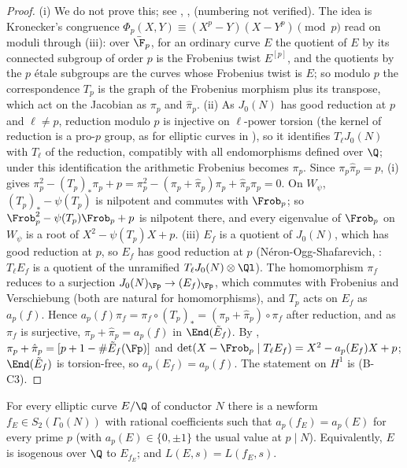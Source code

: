 \begin{proof}
(i) We do not prove this; see \cite[Section 7.4]{Shimura71}, \cite[Section 8.7]{DiamondShurman}, \cite[Section 10]{DiamondIm} (numbering not verified). The idea is
Kronecker's congruence $\Phi_p(X,Y)\equiv(X^p-Y)(X-Y^p)\pmod p$ read on moduli through (iii): over $\bar\F_p$, for an ordinary curve $E$
the quotient of $E$ by its connected subgroup of order $p$ is the Frobenius twist $E^{[p]}$, and the quotients by the $p$ \'etale subgroups are the curves whose Frobenius twist is
$E$; so modulo $p$ the correspondence $T_p$ is the graph of the Frobenius morphism plus its transpose, which act on the Jacobian as $\pi_p$ and $\hat\pi_p$.
(ii) As $J_0(N)$ has good reduction at $p$ and $\ell\ne p$, reduction modulo $p$ is injective on $\ell$-power torsion (the kernel of reduction is a pro-$p$ group, as for elliptic
curves in ), so it identifies $T_\ell J_0(N)$ with $T_\ell$ of the reduction, compatibly with all endomorphisms defined over $\Q$; under this identification the
arithmetic Frobenius becomes $\pi_p$. Since $\pi_p\hat\pi_p=p$, (i) gives $\pi_p^2-(T_p)_*\pi_p+p=\pi_p^2-(\pi_p+\hat\pi_p)\pi_p+\hat\pi_p\pi_p=0$.
On $W_\psi$, $(T_p)_*-\psi(T_p)$ is nilpotent and commutes with $\Frob_p$; so $\Frob_p^2-\psi(T_p)\Frob_p+p$ is nilpotent there, and every eigenvalue of $\Frob_p$ on $W_\psi$ is a
root of $X^2-\psi(T_p)X+p$.
(iii) $E_f$ is a quotient of $J_0(N)$, which has good reduction at $p$, so $E_f$ has good reduction at $p$ (N\'eron-Ogg-Shafarevich, : $T_\ell E_f$ is a quotient of
the unramified $T_\ell J_0(N)\otimes\Ql$). The homomorphism $\pi_f$ reduces to a surjection $J_0(N)_{\Fp}\to(E_f)_{\Fp}$, which commutes with Frobenius and Verschiebung (both are
natural for homomorphisms), and $T_p$ acts on $E_f$ as $a_p(f)$. Hence $a_p(f)\pi_f=\pi_f\circ(T_p)_*=(\pi_p+\hat\pi_p)\circ\pi_f$ after reduction, and as $\pi_f$ is surjective,
$\pi_p+\hat\pi_p=a_p(f)$ in $\End(\tilde E_f)$. By , $\pi_p+\hat\pi_p=[p+1-\#\tilde E_f(\Fp)]$ and $\det(X-\Frob_p\mid T_\ell E_f)=X^2-a_p(E_f)X+p$; $\End(\tilde E_f)$ is
torsion-free, so $a_p(E_f)=a_p(f)$. The statement on $H^1$ is  (B-C3).
\end{proof}

\begin{theorem}\label{thm:moddeg:modularity}
For every elliptic curve $E/\Q$ of conductor $N$ there is a newform $f_E\in S_2(\Gamma_0(N))$ with rational coefficients such that $a_p(f_E)=a_p(E)$ for every prime $p$ (with
$a_p(E)\in\{0,\pm1\}$ the usual value at $p\mid N$). Equivalently, $E$ is isogenous over $\Q$ to $E_{f_E}$; and $L(E,s)=L(f_E,s)$.
\end{theorem}


